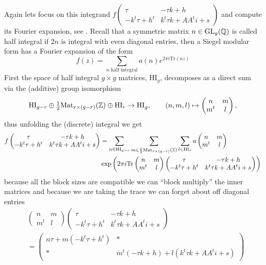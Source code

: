 Again lets focus on this integrand \(f\begin{pmatrix} \tau & -\tau k + h\\ -k^t \tau + h^t & k^t \tau k + A A^t i + s \end{pmatrix}\) and compute its Fourier expansion, see \cite[3.4]{bruinier123ModularForms2008}. Recall that a symmetric matrix \(n\in \GL_g(\Q)\) is called half integral if \(2n\) is integral with even diagonal entries, then a Siegel modular form has a Fourier expansion of the form
\[f(z) = \sum_{n \text{ half integral}}a(n) e^{2\pi i \mathrm{Tr}(nz)} \]
First the space of half integral \(g\times g\) matrices, \(\mathrm{HI}_g\), decomposes as a direct sum via the (additive) group isomorphism 
\[ \mathrm{HI}_{g-r} \oplus \tfrac{ 1}{ 2} \mathrm{Mat}_{ r\times (g-r)}(\Z) \oplus \mathrm{HI}_{r}\to\mathrm{HI}_g, \qquad (n, m, l)\mapsto \begin{pmatrix} n & m\\ m^t & l \end{pmatrix}, \]
thus unfolding the (discrete) integral we get 
\begin{align*}
	f\begin{pmatrix} \tau & -\tau k + h\\ -k^t \tau + h^t & k^t \tau k + A A^t i + s \end{pmatrix} &=   \sum_{n\in\mathrm{HI}_{g-r}} \sum_{m\in\frac{1}{2} \mathrm{Mat}_{ r\times (g-r)}(\Z)} \sum_{l\in\mathrm{HI}_{r}} a\begin{pmatrix} n & m\\ m^t & l \end{pmatrix} \\
	&\exp \left(2\pi i \mathrm{Tr} \begin{pmatrix} n & m\\ m^t & l \end{pmatrix}\begin{pmatrix} \tau & -\tau k + h\\ -k^t \tau + h^t & k^t \tau k + A A^t i + s \end{pmatrix} \right)  \\
\end{align*}
because all the block sizes are compatible we can ``block multiply'' the inner matrices and because we are taking the trace we can forget about off diagonal entries
\begin{align*}
	&\begin{pmatrix} n & m\\ m^t & l \end{pmatrix}\begin{pmatrix} \tau & -\tau k + h\\ -k^t \tau + h^t & k^t \tau k + A A^t i + s \end{pmatrix}\\ &= 
	\begin{pmatrix} n\tau + m(-k^t \tau + h^t ) & \ast\\ \ast & m^t(-\tau k + h) + l( k^t \tau k + A A^t i + s) \end{pmatrix}
\end{align*}
